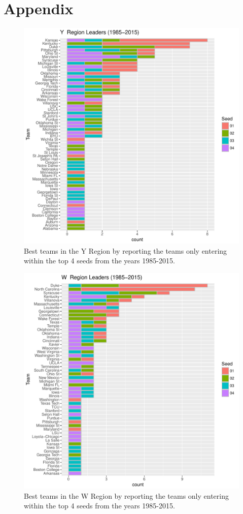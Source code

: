 \documentclass[]{scrartcl}
\begin{document}
\section*{Appendix}
\begin{figure}[H]
	\centering
	\includegraphics[scale=.75]{455Project/YConfLeader.pdf}
	\caption[leaders]{Best teams in the Y Region by reporting the teams only entering within the top 4 seeds from the years 1985-2015. }
	\label{rVals}
\end{figure}

\begin{figure}[H]
	\centering
	\includegraphics[scale=.75]{455Project/WConfLeader.pdf}
	\caption[leaders]{Best teams in the W Region by reporting the teams only entering within the top 4 seeds from the years 1985-2015. }
	\label{rVals}
\end{figure}
\end{document}
